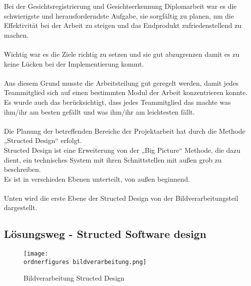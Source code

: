 Bei der Gesichtsregistrierung und Gesichtserkennung Diplomarbeit war es die schwierigste und herausforderndste Aufgabe, sie sorgfältig zu planen, um die Effektivität bei der Arbeit zu steigen und das Endprodukt zufriedenstellend zu machen. \\
 \\
Wichtig war es die Ziele richtig zu setzen und sie gut abzugrenzen damit es zu keine Lücken bei der Implementierung kommt. \\\\
Aus diesem Grund musste die Arbeitsteilung gut geregelt werden, damit jedes Teammitglied sich auf einen bestimmten Modul der Arbeit konzentrieren konnte.\\
Es wurde auch das berücksichtigt, dass jedes Teammitglied das machte was ihm/ihr am besten gefällt und was ihm/ihr am leichtesten fällt. \\ \\
Die Planung der betreffenden Bereiche der Projektarbeit hat durch die Methode „Structed Design“ erfolgt. \\
Structed Design ist eine Erweiterung von der „Big Picture“ Methode, die dazu dient, ein technisches System mit ihren Schnittstellen mit außen grob zu beschreiben. \\
Es ist in verschieden Ebenen unterteilt, von außen beginnend. \\ \\
Unten wird die erste Ebene der Structed Design von der Bildverarbeitungsteil dargestellt. \\

\subsection{Lösungsweg - Structed Software design} 
  

\begin{figure}[H]
	\texttt{[image: \\ordnerfigures bildverarbeitung.png]}
	\caption{Bildverarbeitung Structed Design}
	\label{fig:bildverarbeitung}

\end{figure}

